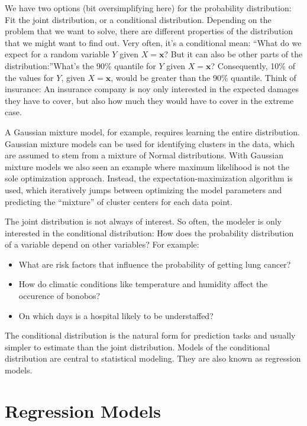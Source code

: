 \documentclass[
  10pt,
]{scrbook}
\providecommand{\tightlist}{%
  \setlength{\itemsep}{0pt}\setlength{\parskip}{0pt}}
\begin{document}
We have two options (bit oversimplifying here) for the probability distribution:
Fit the joint distribution, or a conditional distribution.
Depending on the problem that we want to solve, there are different properties of the distribution that we might want to find out.
Very often, it's a conditional mean: ``What do we expect for a random variable \(Y\) given \(X= \mathbf{x}\)?
But it can also be other parts of the distribution:''What's the 90\% quantile for \(Y\) given \(X = \mathbf{x}\)?
Consequently, 10\% of the values for \(Y\), given \(X=\mathbf{x}\), would be greater than the 90\% quantile.
Think of insurance: An insurance company is noy only interested in the expected damages they have to cover, but also how much they would have to cover in the extreme case.

A Gaussian mixture model, for example, requires learning the entire distribution.
Gaussian mixture models can be used for identifying clusters in the data, which are assumed to stem from a mixture of Normal distributions.
With Gaussian mixture models we also seen an example where maximum likelihood is not the sole optimization approach.
Instead, the expectation-maximization algorithm is used, which iteratively jumps between optimizing the model parameters and predicting the ``mixture'' of cluster centers for each data point.

The joint distribution is not always of interest.
So often, the modeler is only interested in the conditional distribution:
How does the probability distribution of a variable depend on other variables?
For example:

\begin{itemize}
\tightlist
\item
  What are risk factors that influence the probability of getting lung cancer?
\item
  How do climatic conditions like temperature and humidity affect the occurence of bonobos?
\item
  On which days is a hospital likely to be understaffed?
\end{itemize}

The conditional distribution is the natural form for prediction tasks and usually simpler to estimate than the joint distribution.
Models of the conditional distribution are central to statistical modeling.
They are also known as regression models.

\hypertarget{regression-models}{%
\section{Regression Models}\label{regression-models}}
\end{document}
